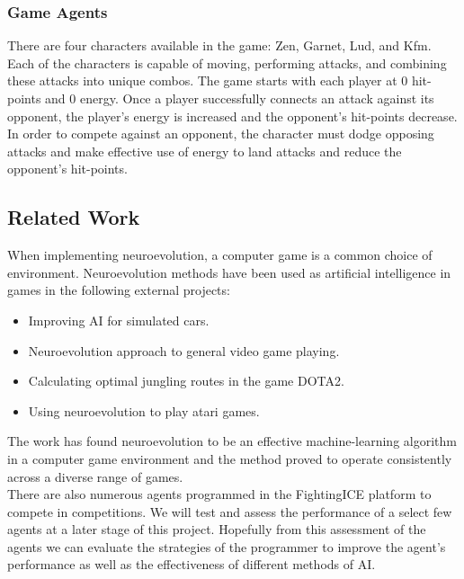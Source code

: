 \documentclass[12pt,a4paper]{article}
\begin{document}
\subsubsection{Game Agents}
There are four characters available in the game: Zen, Garnet, Lud, and Kfm. Each of the characters is capable of moving, performing attacks, and combining these attacks into unique combos. The game starts with each player at 0 hit-points and 0 energy. Once a player successfully connects an attack against its opponent, the player's energy is increased and the opponent's hit-points decrease. In order to compete against an opponent, the character must dodge opposing attacks and make effective use of energy to land attacks and reduce the opponent's hit-points.\\
\begin{figure}[h]
\end{figure}
\newpage
\subsection{Related Work}
When implementing neuroevolution, a computer game is a common choice of environment. Neuroevolution methods have been used as artificial intelligence in games in the following external projects:
\begin{itemize}
\item Improving AI for simulated cars. \cite{pace}
\item Neuroevolution approach to general video game playing. \cite{genvid}
\item Calculating optimal jungling routes in the game DOTA2. \cite{dota}
\item Using neuroevolution to play atari games. \cite{atari}
\end{itemize} 
The work has found neuroevolution to be an effective machine-learning algorithm in a computer game environment and the method proved to operate consistently across a diverse range of games.\\

There are also numerous agents programmed in the FightingICE platform to compete in competitions. \cite{fightingice} We will test and assess the performance of a select few agents at a later stage of this project. Hopefully from this assessment of the agents we can evaluate the strategies of the programmer to improve the agent's performance as well as the effectiveness of different methods of AI.
\end{document}
